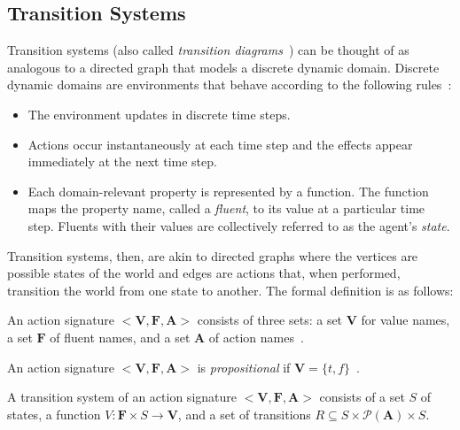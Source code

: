 \subsection{Transition Systems}
\label{subsec:transition_systems}

Transition systems (also called \textit{transition diagrams}~\citep{blount_architecture_2013}) can be thought of as analogous to a directed graph that models a discrete dynamic domain.
Discrete dynamic domains are environments that behave according to the following rules~\citep{blount_architecture_2013}:

\begin{itemize}
    \item The environment updates in discrete time steps.
    \item Actions occur instantaneously at each time step and the effects appear immediately at the next time step.
    \item Each domain-relevant property is represented by a function.
        The function maps the property name, called a \textit{fluent}, to its value at a particular time step.
        Fluents with their values are collectively referred to as the agent's \textit{state}.
\end{itemize}

Transition systems, then, are akin to directed graphs where the vertices are possible states of the world and edges are actions that, when performed, transition the world from one state to another.
The formal definition is as follows:

\begin{definition}
    \label{def:action_signature}
    An action signature $ < \boldsymbol{V}, \boldsymbol{F}, \boldsymbol{A}> $ consists of three sets: a set $ \boldsymbol{V} $ for value names, a set $ \boldsymbol{F} $ of fluent names, and a set $ \boldsymbol{A} $ of action names~\citep{gelfond_action_1998}.
\end{definition}

\begin{definition}
    \label{def:propositional_action_signature}
    An action signature $< \boldsymbol{V}, \boldsymbol{F}, \boldsymbol{A}>$ is \textit{propositional} if $\boldsymbol{V}=\{t,f\}$~\citep{gelfond_action_1998}.
\end{definition}

\begin{definition}
    \label{def:transition_system}
    A transition system of an action signature $ < \boldsymbol{V}, \boldsymbol{F}, \boldsymbol{A}> $ consists of a set $ S $ of states, a function $ V : \boldsymbol{F} \times S\rightarrow \boldsymbol{V} $, and a set of transitions $ R \subseteq S \times \mathcal{P}(\boldsymbol{A}) \times S $.
\end{definition}

